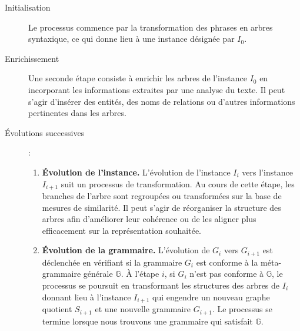 \begin{description}
    \item[Initialisation] Le processus commence par la transformation des phrases en arbres syntaxique, ce qui donne lieu à une instance désignée par $I_0$.

    \item[Enrichissement] Une seconde étape consiste à enrichir les arbres de l'instance $I_0$ en incorporant les informations extraites par une analyse du texte.
          Il peut s'agir d'insérer des entités, des noms de relations ou d'autres informations pertinentes dans les arbres.

    \item[Évolutions successives] :

          \begin{enumerate}
              \item \textbf{Évolution de l'instance.}
                    L'évolution de l'instance $I_i$ vers l'instance $I_{i+1}$ suit un processus de transformation.
                    Au cours de cette étape, les branches de l'arbre sont regroupées ou transformées sur la base de mesures de similarité. Il peut s'agir de réorganiser la structure des arbres afin d'améliorer leur cohérence ou de les aligner plus efficacement sur la représentation souhaitée.

              \item \textbf{Évolution de la grammaire.}
                    L'évolution de $G_i$ vers $G_{i+1}$ est déclenchée en vérifiant si la grammaire $G_i$ est conforme à la méta-grammaire générale $\mathbb{G}$.
                    À l'étape $i$, si $G_i$ n'est pas conforme à $\mathbb{G}$, le processus se poursuit en transformant les structures des arbres de $I_i$ donnant lieu à l'instance $I_{i+1}$ qui engendre un nouveau graphe quotient $S_{i+1}$ et une nouvelle grammaire $G_{i+1}$.
                    Le processus se termine lorsque nous trouvons une grammaire qui satisfait $\mathbb{G}$.
          \end{enumerate}
\end{description}


